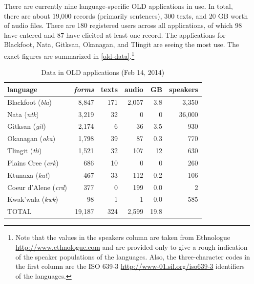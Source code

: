 \documentclass[11pt]{article}
\begin{document}

There are currently nine language-specific OLD applications in use. In total,
there are about 19,000  records (primarily sentences), 300 texts, and 20 GB worth
of audio files.  There are 180 registered users across all applications, of
which 98 have entered and 87 have elicited at least one record. The applications
for Blackfoot, Nata, Gitksan, Okanagan, and Tlingit are seeing the most use. The
exact figures are summarized in \autoref{old-data}.\footnote{
Note that the values in the speakers column are taken from Ethnologue 
\url{http://www.ethnologue.com}  
and are provided only to give a rough indication of the speaker populations of
the languages. Also, the three-character codes in the first column are the ISO
639-3 
\url{http://www-01.sil.org/iso639-3} 
identifiers of the languages.}


\begin{table}[h]
 \begin{center}
     \scriptsize
\begin{tabular}{lrrrrr}

      \toprule
      language &                     \emph{forms}  & texts & audio & GB   & speakers \\
      \midrule
      Blackfoot (\textit{bla}) &     8,847  & 171   & 2,057 & 3.8  & 3,350    \\ %
      Nata (\textit{ntk}) &          3,219  & 32    & 0     & 0    & 36,000   \\ %
      Gitksan (\textit{git}) &       2,174  & 6     & 36    & 3.5  & 930      \\ %
      Okanagan (\textit{oka}) &      1,798  & 39    & 87    & 0.3  & 770      \\ %
      Tlingit (\textit{tli}) &       1,521  & 32    & 107   & 12   & 630      \\ %
      Plains Cree (\textit{crk}) &   686    & 10    & 0     & 0    & 260      \\ %
      Ktunaxa (\textit{kut}) &       467    & 33    & 112   & 0.2  & 106      \\ %
      Coeur d'Alene (\textit{crd}) & 377    & 0     & 199   & 0.0  & 2        \\ %
      Kwak'wala (\textit{kwk}) &     98     & 1     & 1     & 0.0  & 585      \\ %
      TOTAL &                        19,187 & 324   & 2,599 & 19.8 &         \\ %
      \bottomrule

\end{tabular}
\caption{Data in OLD applications (Feb 14, 2014)}
\label{old-data}
 \end{center}
 \normalsize
\end{table}
\end{document}
